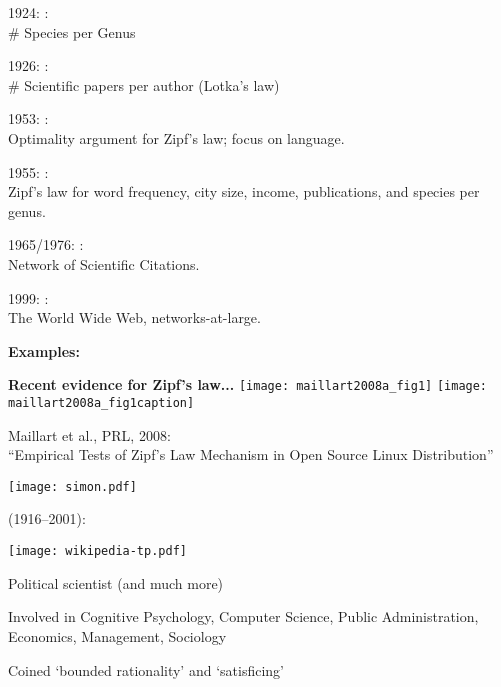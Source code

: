   
    
    
      1924: \cite{yule1924a}:\\ \# Species per Genus
    
      1926: \cite{lotka1926a}:\\ \# Scientific papers per author (Lotka's law)
    
      1953: \cite{mandelbrot1953a}:\\ Optimality argument
      for Zipf's law; focus on language.
    
      1955: \cite{simon1955a,zipf1949a}:\\ Zipf's law for
      word frequency, city size, income, publications, and species per genus.
    
      1965/1976: \cite{price1965a,price1976a}:\\ Network of Scientific Citations.
     
      1999: \cite{barabasi1999a}:\\ The World Wide Web, networks-at-large.
    
  


  \textbf{Examples:}

  \textbf{Recent evidence for Zipf's law...}
    \texttt{[image: maillart2008a\_fig1]}
    \texttt{[image: maillart2008a\_fig1caption]}

    Maillart et al., PRL, 2008:\\
    ``Empirical Tests of {Z}ipf's Law Mechanism in 
    Open Source {L}inux Distribution''\cite{maillart2008a}
  
  


  
          
      
      \texttt{[image: simon.pdf]}
      
       (1916--2001):
      
      \texttt{[image: wikipedia-tp.pdf]}
      
      
   
    Political scientist (and much more)
   
    Involved in Cognitive Psychology, Computer Science, Public Administration,
    Economics, Management, Sociology
   
    Coined `bounded rationality' and `satisficing'
   
